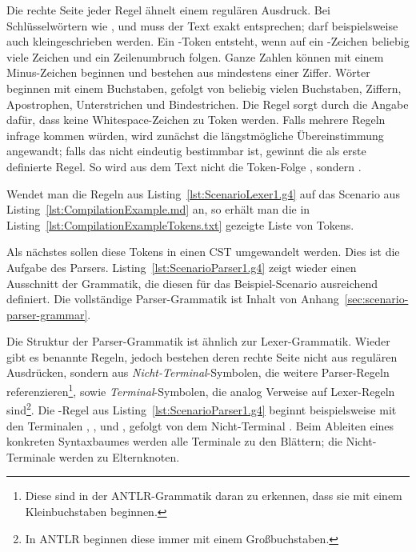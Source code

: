 Die rechte Seite jeder Regel ähnelt einem regulären Ausdruck.
Bei Schlüsselwörtern wie ,  und  muss der Text exakt entsprechen;
 darf beispielsweise auch kleingeschrieben werden.
Ein -Token entsteht, wenn auf ein \code{#}-Zeichen beliebig viele Zeichen und ein Zeilenumbruch folgen.
Ganze Zahlen können mit einem Minus-Zeichen beginnen und bestehen aus mindestens einer Ziffer.
Wörter beginnen mit einem Buchstaben, gefolgt von beliebig vielen Buchstaben, Ziffern, Apostrophen, Unterstrichen und Bindestrichen.
Die Regel  sorgt durch die Angabe  dafür, dass keine Whitespace-Zeichen zu Token werden.
Falls mehrere Regeln infrage kommen würden, wird zunächst die längstmögliche Übereinstimmung angewandt;
falls das nicht eindeutig bestimmbar ist, gewinnt die als erste definierte Regel.
So wird aus dem Text  nicht die Token-Folge , sondern .

Wendet man die Regeln aus Listing~\ref{lst:ScenarioLexer1.g4} auf das Scenario aus Listing~\ref{lst:CompilationExample.md} an,
so erhält man die in Listing~\ref{lst:CompilationExampleTokens.txt} gezeigte Liste von Tokens.


Als nächstes sollen diese Tokens in einen CST umgewandelt werden.
Dies ist die Aufgabe des Parsers.
Listing~\ref{lst:ScenarioParser1.g4} zeigt wieder einen Ausschnitt der Grammatik,
die diesen für das Beispiel-Scenario ausreichend definiert.
Die vollständige Parser-Grammatik ist Inhalt von Anhang~\ref{sec:scenario-parser-grammar}.


Die Struktur der Parser-Grammatik ist ähnlich zur Lexer-Grammatik.
Wieder gibt es benannte Regeln, jedoch bestehen deren rechte Seite nicht aus regulären Ausdrücken,
sondern aus \emph{Nicht-Terminal}-Symbolen, die weitere Parser-Regeln referenzieren\footnote{Diese sind in der ANTLR-Grammatik daran zu erkennen, dass sie mit einem Kleinbuchstaben beginnen.},
sowie \emph{Terminal}-Symbolen, die analog Verweise auf Lexer-Regeln sind\footnote{In ANTLR beginnen diese immer mit einem Großbuchstaben.}.
Die -Regel aus Listing~\ref{lst:ScenarioParser1.g4} beginnt beispielsweise mit den Terminalen , ,  und , gefolgt von dem Nicht-Terminal .
Beim Ableiten eines konkreten Syntaxbaumes werden alle Terminale zu den Blättern;
die Nicht-Terminale werden zu Elternknoten.

